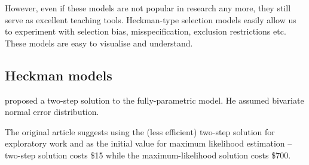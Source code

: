 However, even if these models are not popular in research any more,
they still serve as excellent teaching tools.  Heckman-type selection
models easily allow us to experiment with selection bias,
misspecification, exclusion restrictions etc.  These models are easy
to visualise and understand.


\subsection{Heckman models}

\citet{heckman76} proposed a two-step solution to the fully-parametric
model.  He assumed bivariate normal error distribution.

The original article suggests using the (less efficient) two-step
solution for exploratory work and as the initial value for maximum
likelihood estimation -- two-step solution costs \$15 while the
maximum-likelihood solution costs \$700.

